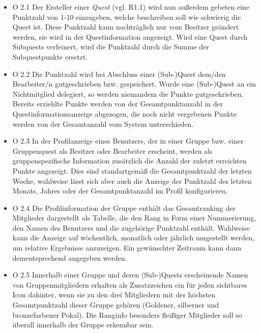 \documentclass{article}
\begin{document}
    \begin{itemize}
	\item{O 2.1} Der Ersteller einer \textit{Quest} (vgl. R1.1) wird nun außerdem gebeten eine Punktzahl von 1-10 einzugeben, welche beschreiben soll wie schwierig die Quest ist. 			Diese Punktzahl kann nachträglich nur vom Besitzer geändert werden, sie wird in der Questinformation angezeigt. Wird eine Quest durch Subquests verfeinert, wird die Punktzahl 			durch die Summe der Subquestpunkte ersetzt.

	\item{O 2.2} Die Punktzahl wird bei Abschluss einer (Sub-)Quest dem/den Bearbeiter/n gutgeschrieben bzw. gespeichert. Wurde eine (Sub-)Quest an ein Nichtmitglied delegiert, so 		werden niemandem die Punkte gutgeschrieben. \\
  	Bereits erziehlte Punkte werden von der Gesamtpunktanzahl in der Questinformationsanzeige abgezogen, die noch nicht vergebenen Punkte werden von der Gesamtanzahl vom System 			unterschieden.

        \item{O 2.3} In der Profilanzeige eines Benutzers, der in einer Gruppe bzw. einer Gruppenquest als Besitzer oder Bearbeiter erscheint, werden als gruppenspezifische Information 		zusätzlich die Anzahl der zuletzt erreichten Punkte angezeigt. Dies sind standartgemäß die Gesamtpunktzahl der letzten Woche, wahlweise lässt sich aber auch die Anzeige der Punktzahl 		des letzten Monats, Jahres oder der Gesamtpunktanzahl im Profil konfigurieren.
    		

        \item{O 2.4} Die Profilinformation der Gruppe enthält das Gesamtranking der Mitglieder dargestellt als  Tabelle, die den Rang in Form einer Nummerierung, den Namen des Benutzers und 		die zugehörige Punktzahl enthält.
        Wahlweise kann die Anzeige auf wöchentlich, monatlich oder jährlich umgestellt werden, um relative Ergebnisse anzuzeigen. Ein gewünschter Zeitraum kann dann dementsprechend angegeben 		werden.

        \item{O 2.5} Innerhalb einer Gruppe und deren (Sub-)Quests erscheinende Namen von Gruppenmitgliedern erhalten als Zusatzzeichen ein für jeden sichtbares Icon dahinter, wenn sie zu den 	drei Mitgliedern mit der höchsten Gesamtpunktzahl dieser Gruppe gehören (Goldener, silberner und bronzefarbener Pokal). Die Ranginfo besonders fleißiger Mitglieder soll so überall 		innerhalb der Gruppe erkennbar sein.
	
    \end{itemize}
\end{document}
